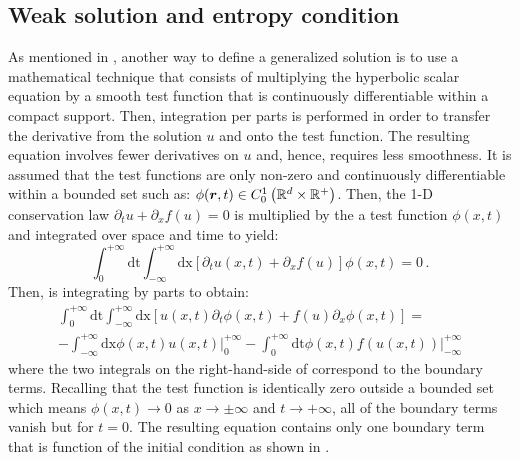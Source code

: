 \subsection{Weak solution and entropy condition}\label{weak_sct1b}
As mentioned in , another way to define a generalized solution is to use a mathematical technique that consists of multiplying the hyperbolic scalar equation by a smooth test function that is continuously differentiable within a compact support. Then, integration per parts is performed in order to transfer the derivative from the solution $u$ and onto the test function. The resulting equation involves fewer derivatives on $u$ and, hence, requires less smoothness. It is assumed that the test functions are only non-zero and continuously differentiable within a bounded set such as: $\phi(\boldsymbol r,t) \in C_0^1 \left( \mathbb{R}^d \times \mathbb{R^+} \right)$. 
Then, the 1-D conservation law $\partial_t u + \partial_x f(u) = 0$ is multiplied by the a test function $\phi(x,t)$ and integrated over space and time to yield:
%
\begin{equation}\label{eq:weak_sol_sct1b}
\int_0^{+\infty}\text{dt}\int_{-\infty}^{+\infty}\text{dx} \left[ \partial_t u(x,t) + \partial_x f(u) \right] \phi(x,t) = 0 \,.
\end{equation}
% 
Then,  is integrating by parts to obtain:
%
\begin{eqnarray}\label{eq:weak_sol2_sct1b}
\int_0^{+\infty}\text{dt}\int_{-\infty}^{+\infty}\text{dx} \left[ u(x,t) \partial_t \phi(x,t)   + f(u) \partial_x \phi(x,t)  \right] = \nonumber \\
-\int_{-\infty}^{+\infty}\text{dx} \phi(x,t) u(x,t) \left. \right|_0^{+\infty} - \int_0^{+\infty}\text{dt} \phi(x,t) f(u(x,t)) \left. \right|_{-\infty}^{+\infty}
\end{eqnarray}
%
where the two integrals on the right-hand-side of  correspond to the boundary terms. Recalling that the test function is identically zero outside a bounded set which means $\phi(x,t) \to 0$ as $x \to \pm  \infty$ and $t \to +\infty$,   all of the boundary terms vanish but for $t=0$. The resulting equation contains only one boundary term that is function of the initial condition as shown in .
